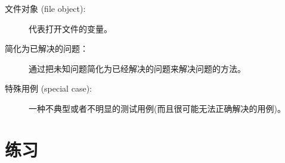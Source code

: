 \begin{description}

  

\item[文件对象 (file object):] 代表打开文件的变量。
  


\item[简化为已解决的问题：] 通过把未知问题简化为已经解决的问题来解决问题的方法。
  


\item[特殊用例 (special case):] 一种不典型或者不明显的测试用例(而且很可能无法正确解决的用例)。

\end{description}


\section{练习}

